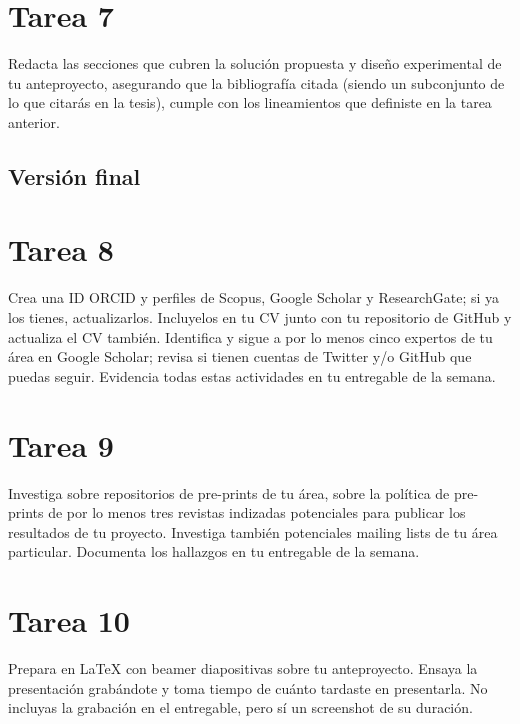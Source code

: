 \documentclass[12pt,letterpaper]{article}
\begin{document}
\section*{Tarea 7}
Redacta las secciones que cubren la solución propuesta y diseño experimental de tu anteproyecto, asegurando que la bibliografía citada (siendo un subconjunto de lo que citarás en la tesis), cumple con los lineamientos que definiste en la tarea anterior.

\subsection*{Versión final}

\section*{Tarea 8}
Crea una ID ORCID y perfiles de Scopus, Google Scholar y ResearchGate; si ya los tienes, actualizarlos. Incluyelos en tu CV junto con tu repositorio de GitHub y actualiza el CV también. Identifica y sigue a por lo menos cinco expertos de tu área en Google Scholar; revisa si tienen cuentas de Twitter y/o GitHub que puedas seguir. Evidencia todas estas actividades en tu entregable de la semana.

\section*{Tarea 9}
Investiga sobre repositorios de pre-prints de tu área, sobre la política de pre-prints de por lo menos tres revistas indizadas potenciales para publicar los resultados de tu proyecto. Investiga también potenciales mailing lists de tu área particular. Documenta los hallazgos en tu entregable de la semana.

\section*{Tarea 10}
Prepara en LaTeX con beamer diapositivas sobre tu anteproyecto. Ensaya la presentación grabándote y toma tiempo de cuánto tardaste en presentarla. No incluyas la grabación en el entregable, pero sí un screenshot de su duración.

\end{document}
